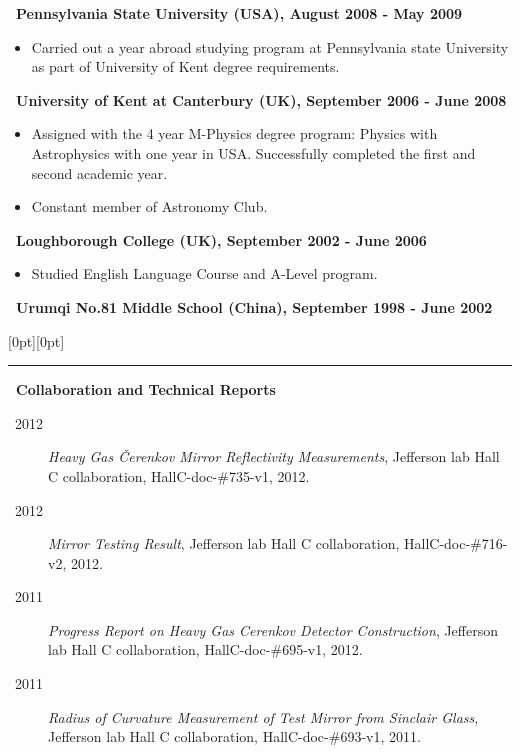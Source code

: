 \documentclass[a4paper,12pt]{letter}
\begin{document}
\textbf{\normalsize ~Pennsylvania State University (USA), August 2008 - May 2009}  \\[-8mm] 

\begin{itemize}
\item \textrm{\normalsize Carried out a year abroad studying program at Pennsylvania state University as part of University of Kent degree requirements.}
\end{itemize}

\textbf{\normalsize ~University of Kent at Canterbury (UK), September 2006 - June 2008}  \\[-8mm] 
\begin{itemize}
\item \textrm{\normalsize Assigned with the 4 year M-Physics degree program: Physics with Astrophysics with one year in USA. Successfully completed the first and second academic year.}
\item \textrm{\normalsize Constant member of Astronomy Club.}
\end{itemize}

\textbf{\normalsize ~Loughborough College (UK), September 2002 - June 2006}  \\[-8mm] 
\begin{itemize}
\item \textrm{\normalsize Studied English Language Course and A-Level program.}
\end{itemize}

\textbf{\normalsize ~Urumqi No.81 Middle School (China), September 1998 - June 2002} \\[-8mm] 


\vspace{3mm}



\raisebox{0pt}[0pt][0pt]{\Large\textbf{\raisebox{-3.5ex}{Referenced Publications}}}
\\[2mm]
\rule[-0.5cm]{10cm}{1pt}

\vspace{2mm}

\textbf{\normalsize ~Collaboration and Technical Reports} \parab
\begin{description}
\item[~2012] \textrm{\normalsize \emph{Heavy Gas \v{C}erenkov Mirror Reflectivity Measurements}, Jefferson lab Hall C collaboration, HallC-doc-\#735-v1, 2012. }
\item[~2012] \textrm{\normalsize \emph{Mirror Testing Result}, Jefferson lab Hall C collaboration, HallC-doc-\#716-v2, 2012. }
\item[~2011] \textrm{\normalsize \emph{Progress Report on Heavy Gas Cerenkov Detector Construction}, Jefferson lab Hall C collaboration, HallC-doc-\#695-v1, 2012. }
\item[~2011] \textrm{\normalsize \emph{Radius of Curvature Measurement of Test Mirror from Sinclair Glass}, Jefferson lab Hall C collaboration, HallC-doc-\#693-v1, 2011.}
\end{description}
\end{document}
